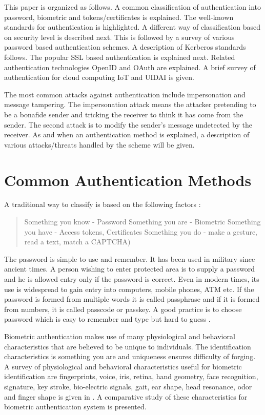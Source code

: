 \begin{multicols}{2}
This paper is organized as follows. A common classification of authentication into password, biometric and tokens/certificates is explained. The well-known standards for authentication is highlighted. A different way of classification based on security level is described next. This is followed by a survey of various password based authentication schemes. A description of Kerberos standards follows. The popular SSL based authentication is explained next. Related authentication technologies OpenID and OAuth are explained. A brief survey of authentication for cloud computing IoT and UIDAI is given.

The most common attacks against authentication include impersonation and message tampering. The impersonation attack means the attacker pretending to be a bonafide sender and tricking the receiver to think it has come from the sender. The second attack is to modify the sender's message undetected by the receiver. As and when an authentication method is explained, a description of various attacks/threats handled by the scheme will be given.

\section*{Common Authentication Methods}

A traditional way to classify is based on the following factors \cite{chap2-key2}:
\begin{quote}
Something you know - Password
Something you are - Biometric
Something you have - Access tokens, Certificates
Something you do - make a gesture, read a text, match a CAPTCHA)
\end{quote}

The password is simple to use and remember. It has been used in military since ancient times. A person wishing to enter protected area is to supply a password and he is allowed entry only if the password is correct. Even in modern times, its use is widespread to gain entry into computers, mobile phones, ATM etc. If the password is formed from multiple words it is called passphrase and if it is formed from numbers, it is called passcode or passkey. A good practice is to choose password which is easy to remember and type but hard to guess \cite{chap2-key2}.

Biometric authentication makes use of many physiological and behavioral characteristics that are believed to be unique to individuals. The identification characteristics is something you are and uniqueness ensures difficulty of forging. A survey of physiological and behavioral characteristics useful for biometric identification are fingerprints, voice, iris, retina, hand geometry, face recognition, signature, key stroke, bio-electric signals, gait, ear shape, head resonance, odor and finger shape is given in \cite{chap2-key3}. A comparative study of these characteristics for biometric authentication system is presented. 


\end{multicols}
